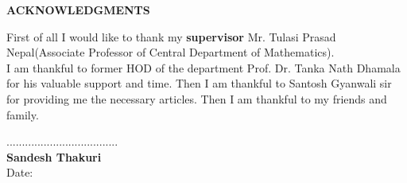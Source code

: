 
\begin{center}
{\Large{\bfseries ACKNOWLEDGMENTS}}
\end{center}

\vspace{1cm}
First of all I would like to thank my \textbf{supervisor} Mr. Tulasi Prasad Nepal(Associate Professor of Central Department of Mathematics).\\

I am thankful to former HOD of the department Prof. Dr. Tanka Nath Dhamala for his valuable support and time. Then I am thankful to Santosh Gyanwali sir for providing me the necessary articles. Then I am thankful to my friends and family.
\\[5cm]

\begin{minipage}{1\textwidth}
	\begin{flushright}
		....................................\\
		{\bfseries Sandesh Thakuri}\\
		Date: \thedate
	\end{flushright}
\end{minipage}

\clearpage